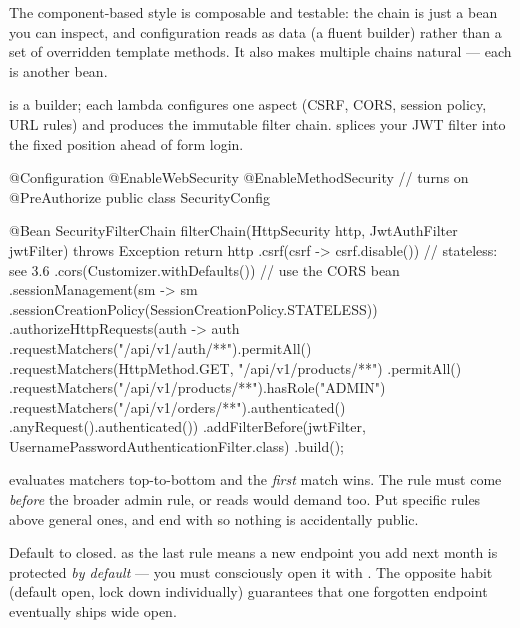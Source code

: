  The component-based style is composable and testable: the chain is just a bean you can inspect, and configuration reads as data (a fluent builder) rather than a set of overridden template methods. It also makes multiple chains natural --- each is another bean.

  is a builder; each lambda configures one aspect (CSRF, CORS, session policy, URL rules) and  produces the immutable filter chain.  splices your JWT filter into the fixed position ahead of form login.

\begin{javabox}
@Configuration
@EnableWebSecurity
@EnableMethodSecurity            // turns on @PreAuthorize
public class SecurityConfig {

  @Bean
  SecurityFilterChain filterChain(HttpSecurity http,
      JwtAuthFilter jwtFilter) throws Exception {
    return http
      .csrf(csrf -> csrf.disable())               // stateless: see 3.6
      .cors(Customizer.withDefaults())            // use the CORS bean
      .sessionManagement(sm -> sm
          .sessionCreationPolicy(SessionCreationPolicy.STATELESS))
      .authorizeHttpRequests(auth -> auth
          .requestMatchers("/api/v1/auth/**").permitAll()
          .requestMatchers(HttpMethod.GET, "/api/v1/products/**")
              .permitAll()
          .requestMatchers("/api/v1/products/**").hasRole("ADMIN")
          .requestMatchers("/api/v1/orders/**").authenticated()
          .anyRequest().authenticated())
      .addFilterBefore(jwtFilter,
          UsernamePasswordAuthenticationFilter.class)
      .build();
  }
}
\end{javabox}

  evaluates matchers top-to-bottom and the \emph{first} match wins. The  rule must come \emph{before} the broader  admin rule, or reads would demand  too. Put specific rules above general ones, and end with  so nothing is accidentally public.

\begin{prodtip}
Default to closed.  as the last rule means a new endpoint you add next month is protected \emph{by default} --- you must consciously open it with . The opposite habit (default open, lock down individually) guarantees that one forgotten endpoint eventually ships wide open.
\end{prodtip}

